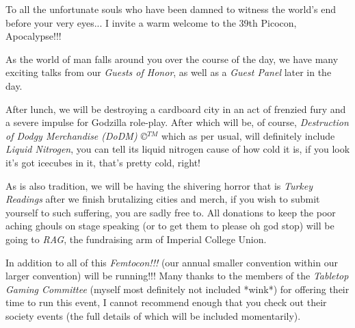 To all the unfortunate souls who have been damned to witness the world's end before your very eyes... I invite a warm welcome to the 39th Picocon, Apocalypse!!!

As the world of man falls around you over the course of the day, we have many exciting talks from our \emph{Guests of Honor}, as well as a \emph{Guest Panel\footnotemark[1]} later in the day.

After lunch, we will be destroying a cardboard city in an act of frenzied fury and a severe impulse for Godzilla role-play. After which will be, of course, \emph{Destruction of Dodgy Merchandise (DoDM) \copyright $^{TM}$\footnotemark[2]} which as per usual, will definitely include \emph{Liquid Nitrogen}, you can tell its liquid nitrogen cause of how cold it is, if you look it's got icecubes in it, that's pretty cold, right!\footnotemark[3]

As is also tradition, we will be having the shivering horror that is \emph{Turkey Readings} after we finish brutalizing cities and merch, if you wish to submit yourself to such suffering, you are sadly free to. All donations to keep the poor aching ghouls on stage speaking (or to get them to please oh god stop) will be going to \emph{RAG}, the fundraising arm of Imperial College Union.

In addition to all of this \emph{Femtocon!!!} (our annual smaller convention within our larger convention) will be running!!! Many thanks to the members of the \emph{Tabletop Gaming Committee} (myself most definitely not included *wink*) for offering their time to run this event, I cannot recommend enough that you check out their society events (the full details of which will be included momentarily).

